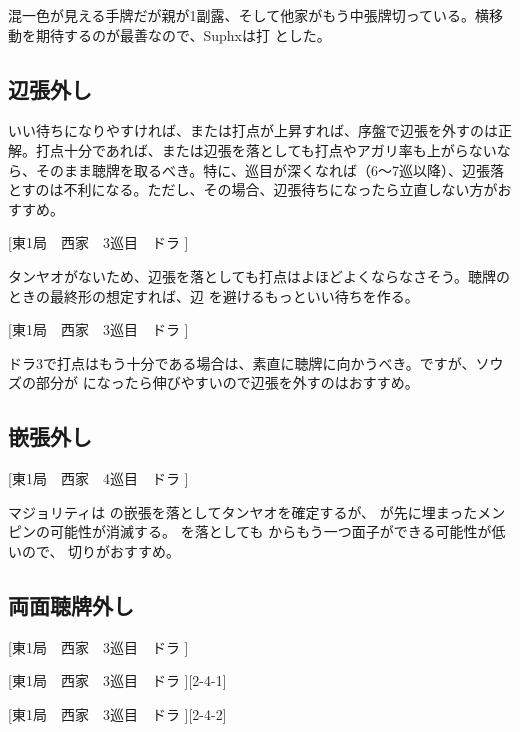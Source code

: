 \documentclass[../nankiru_main.tex]{subfiles}
\begin{document}
混一色が見える手牌だが親が1副露、そして他家がもう中張牌切っている。横移動を期待するのが最善なので、Suphxは打  とした\citep[][p.~35]{suphx}。

\subsection{辺張外し}

いい待ちになりやすければ、または打点が上昇すれば、序盤で辺張を外すのは正解。打点十分であれば、または辺張を落としても打点やアガリ率も上がらないなら、そのまま聴牌を取るべき。特に、巡目が深くなれば（6〜7巡以降）、辺張落とすのは不利になる。ただし、その場合、辺張待ちになったら立直しない方がおすすめ\citep[][pp. 48--55]{tetsusenryaku}。

[東1局　西家　3巡目　ドラ ]

タンヤオがないため、辺張を落としても打点はよほどよくならなさそう。聴牌のときの最終形の想定すれば、辺  を避けるもっといい待ちを作る。

[東1局　西家　3巡目　ドラ ]

ドラ3で打点はもう十分である場合は、素直に聴牌に向かうべき。ですが、ソウズの部分が  になったら伸びやすいので辺張を外すのはおすすめ。

\subsection{嵌張外し}

[東1局　西家　4巡目　ドラ ]

マジョリティは  の嵌張を落としてタンヤオを確定するが、 が先に埋まったメンピンの可能性が消滅する。 を落としても  からもう一つ面子ができる可能性が低いので、 切りがおすすめ\citep[][pp. 92--97]{tetsusenryaku}。

\subsection{両面聴牌外し}

[東1局　西家　3巡目　ドラ ]

[東1局　西家　3巡目　ドラ ][2-4-1]

[東1局　西家　3巡目　ドラ ][2-4-2]
\end{document}
